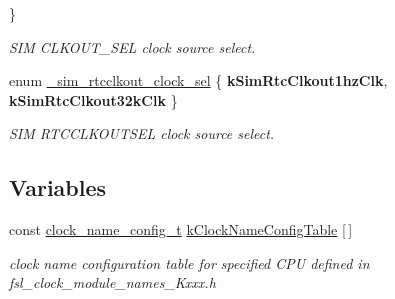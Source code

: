 \begin{DoxyCompactItemize}
 \}\hypertarget{group__sim__hal_ga10bf1258a147a8d691ef8e8afcc1b28a}{}\label{group__sim__hal_ga10bf1258a147a8d691ef8e8afcc1b28a}
\begin{DoxyCompactList}\small\item\em S\+IM C\+L\+K\+O\+U\+T\+\_\+\+S\+EL clock source select. \end{DoxyCompactList}
\item 
enum \hyperlink{group__sim__hal_gaa27f7d28ea6be6d650701233789da408}{\+\_\+sim\+\_\+rtcclkout\+\_\+clock\+\_\+sel} \{ {\bfseries k\+Sim\+Rtc\+Clkout1hz\+Clk}, 
{\bfseries k\+Sim\+Rtc\+Clkout32k\+Clk}
 \}\hypertarget{group__sim__hal_gaa27f7d28ea6be6d650701233789da408}{}\label{group__sim__hal_gaa27f7d28ea6be6d650701233789da408}
\begin{DoxyCompactList}\small\item\em S\+IM R\+T\+C\+C\+L\+K\+O\+U\+T\+S\+EL clock source select. \end{DoxyCompactList}
\end{DoxyCompactItemize}
\subsection*{Variables}
\begin{DoxyCompactItemize}
\item 
const \hyperlink{group__sim__hal_ga0d84063eacefa134ba3be72a9c70222c}{clock\+\_\+name\+\_\+config\+\_\+t} \hyperlink{group__sim__hal_gaea8903216c2956a8f1a48dda0ddeaffc}{k\+Clock\+Name\+Config\+Table} \mbox{[}$\,$\mbox{]}\hypertarget{group__sim__hal_gaea8903216c2956a8f1a48dda0ddeaffc}{}\label{group__sim__hal_gaea8903216c2956a8f1a48dda0ddeaffc}

\begin{DoxyCompactList}\small\item\em clock name configuration table for specified C\+PU defined in fsl\+\_\+clock\+\_\+module\+\_\+names\+\_\+\+Kxxx.\+h \end{DoxyCompactList}\end{DoxyCompactItemize}
